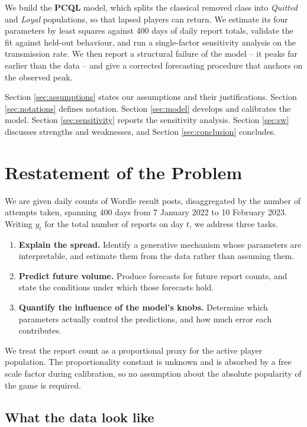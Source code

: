 \documentclass[12pt]{article}
\begin{document}
We build the \textbf{PCQL} model, which splits the classical removed class into
\emph{Quitted} and \emph{Loyal} populations, so that lapsed players can return.
We estimate its four parameters by least squares against 400 days of daily
report totals, validate the fit against held-out behaviour, and run a
single-factor sensitivity analysis on the transmission rate. We then report a
structural failure of the model -- it peaks far earlier than the data -- and
give a corrected forecasting procedure that anchors on the observed peak.

Section \ref{sec:assumptions} states our assumptions and their justifications.
Section \ref{sec:notations} defines notation. Section \ref{sec:model} develops
and calibrates the model. Section \ref{sec:sensitivity} reports the sensitivity
analysis. Section \ref{sec:sw} discusses strengths and weaknesses, and
Section \ref{sec:conclusion} concludes.

\section{Restatement of the Problem}\label{sec:SEC-020}
We are given daily counts of Wordle result posts, disaggregated by the number
of attempts taken, spanning 400 days from 7 January 2022 to
10 February 2023. Writing $y_t$ for the total number of reports on
day $t$, we address three tasks.

\begin{enumerate}
  \item \textbf{Explain the spread.} Identify a generative mechanism whose
  parameters are interpretable, and estimate them from the data rather than
  assuming them.
  \item \textbf{Predict future volume.} Produce forecasts for future report
  counts, and state the conditions under which those forecasts hold.
  \item \textbf{Quantify the influence of the model's knobs.} Determine which
  parameters actually control the predictions, and how much error each
  contributes.
\end{enumerate}

We treat the report count as a proportional proxy for the active player
population. The proportionality constant is unknown and is absorbed by a free
scale factor during calibration, so no assumption about the absolute
popularity of the game is required.

\subsection{What the data look like}
\end{document}
